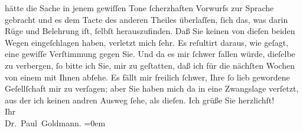                hätte die Sache in jenem gewiſſen Tone ſcherzhaften Vorwurfs zur Sprache gebracht und
               es dem Tacte des anderen Theiles überlaſſen, ſich das, was darin Rüge und Belehrung
               iſt, ſelbſt herauszufinden.\pend
           \pstart
           Daß Sie  keinen von dieſen beiden Wegen
               eingeſchlagen haben, verletzt mich ſehr. Es reſultirt daraus, wie geſagt, eine
               gewiſſe Verſtimmung gegen Sie. Und da es mir ſchwer fallen würde, dieſelbe zu
               verbergen, ſo bitte ich Sie, \strikeout{\textcolor{gray}{d}} mir zu geſtatten, daß ich für die nächſten Wochen von einem {\pb}\label{K_L02646-3v}\label{K_L02646-3h} mit Ihnen abſehe. Es fällt
               mir freilich ſchwer, Ihre ſo lieb gewordene Geſellſchaft mir zu verſagen; aber Sie
               haben mich da in eine Zwangslage verſetzt, aus der ich keinen andren Ausweg ſehe, als
               dieſen.\pend
           \pstart
           Ich grüße Sie herzlichſt! {\\[\baselineskip]}Ihr {\\[\baselineskip]}\spacefill\mbox{Dr. Paul Goldmann.}\pend
           \leftskip=0em{}\endnumbering{}  
      
